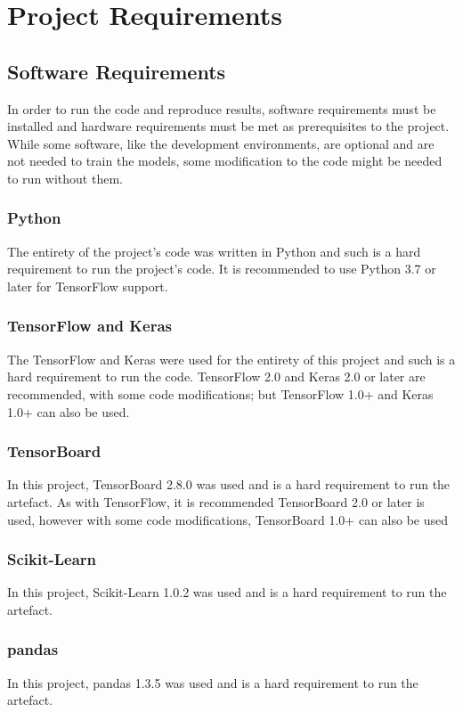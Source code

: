 \section{Project Requirements} \label{project-requirements}
\subsection{Software Requirements}
In order to run the code and reproduce results, software requirements must be installed and hardware requirements must be met as prerequisites to the project. While some software, like the development environments, are optional and are not needed to train the models, some modification to the code might be needed to run without them.

\subsubsection{Python}
The entirety of the project's code was written in Python and such is a hard requirement to run the project's code. It is recommended to use Python 3.7 or later for TensorFlow support.

\subsubsection{TensorFlow and Keras}
The TensorFlow and Keras were used for the entirety of this project and such is a hard requirement to run the code. TensorFlow 2.0 and Keras 2.0 or later are recommended, with some code modifications; but TensorFlow 1.0+ and Keras 1.0+ can also be used.

\subsubsection{TensorBoard}
In this project, TensorBoard 2.8.0 was used and is a hard requirement to run the artefact. As with TensorFlow, it is recommended TensorBoard 2.0 or later is used, however with some code modifications, TensorBoard 1.0+ can also be used

\subsubsection{Scikit-Learn}
In this project, Scikit-Learn 1.0.2 was used and is a hard requirement to run the artefact.

\subsubsection{pandas}
In this project, pandas 1.3.5 was used and is a hard requirement to run the artefact.

